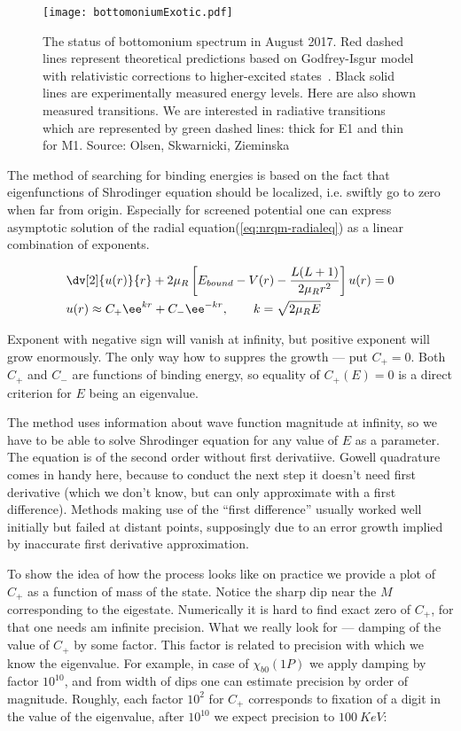 \begin{figure}[H]
    \centering
    \texttt{[image: bottomoniumExotic.pdf]}
    \caption{The status of bottomonium spectrum in August 2017. Red dashed lines represent theoretical predictions based on Godfrey-Isgur model with relativistic corrections to higher-excited states~\cite{gbs-model}. Black solid lines are experimentally measured energy levels. Here are also shown measured transitions. We are interested in radiative transitions which are represented by green dashed lines: thick for E1 and thin for M1. Source: Olsen, Skwarnicki, Zieminska~\cite{heavy-quark_pics}} \label{fig:bot-states}
\end{figure}

The method of searching for binding energies is based on the fact that eigenfunctions of Shrodinger equation should be localized, i.e. swiftly go to zero when far from origin. Especially for screened potential one can express asymptotic solution of  the radial equation(\cref{eq:nrqm-radialeq}) as a linear combination of exponents.

\begin{align}
    &\dv[2]{u(r)}{r} + 2 \mu_R \left[ E_{bound} - V(r) - \frac{L(L+1)}{2 \mu_R r^2} \right] u(r) = 0 \\
    &u(r) \approx C_+ \ee^{k r} + C_- \ee^{-k r},\qquad k = \sqrt{2 \mu_R E} \nonumber
\end{align}

Exponent with negative sign will vanish at infinity, but positive exponent will grow enormously. The only way how to suppres the growth --- put $C_+ = 0$. Both $C_+$ and $C_-$ are functions of binding energy, so equality of $C_+(E) = 0$ is a direct criterion for $E$ being an eigenvalue.

The method uses information about wave function magnitude at infinity, so we have to be able to solve Shrodinger equation for any value of $E$ as a parameter. The equation is of the second order without first derivatiive. Gowell quadrature~\cite{deng-bot} comes in handy here, because to conduct the next step it doesn't need first derivative (which we don't know, but can only approximate with a first difference). Methods making use of the ``first difference'' usually worked well initially but failed at distant points, supposingly due to an error growth implied by inaccurate first derivative approximation. 

To show the idea of how the process looks like on practice we provide a plot of $C_+$ as a function of mass of the state. Notice the sharp dip near the $M$ corresponding to the eigestate. Numerically it is hard to find exact zero of $C_+$, for that one needs am infinite precision. What we really look for --- damping of the value of $C_+$ by some factor. This factor is related to precision with which we know the eigenvalue. For example, in case of $\chi_{b0}(1P)$ we apply damping by factor $10^{10}$, and from width of dips one can estimate precision by order of magnitude. Roughly, each factor $10^{2}$ for $C_+$ corresponds to fixation of a digit in the value of the eigenvalue, after $10^{10}$ we expect precision to $100~KeV$:

